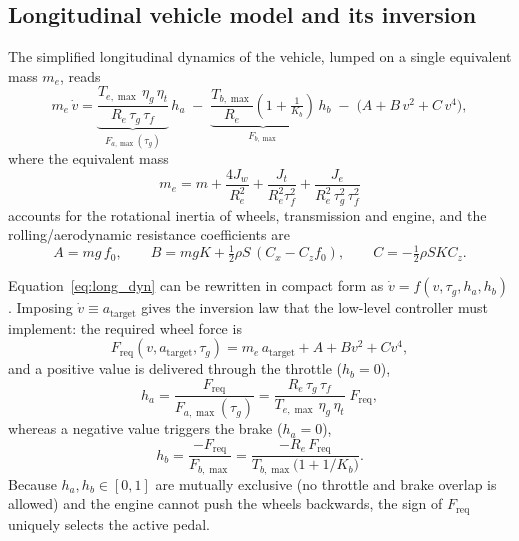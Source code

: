 \subsection{Longitudinal vehicle model and its inversion}
The simplified longitudinal dynamics of the vehicle, lumped on a single
equivalent mass $m_e$, reads
\begin{equation}
    m_e\,\dot v =
        \underbrace{\frac{T_{e,\max}\,\eta_g\,\eta_t}{R_e\,\tau_g\,\tau_f}}_{F_{a,\max}(\tau_g)}\,h_a
        \;-\;
        \underbrace{\frac{T_{b,\max}}{R_e}\!\left(1+\tfrac{1}{K_b}\right)}_{F_{b,\max}}\,h_b
        \;-\;
        \bigl(A + B\,v^{2} + C\,v^{4}\bigr),
        \label{eq:long_dyn}
\end{equation}
where the equivalent mass
\begin{equation}
    m_e = m + \frac{4 J_w}{R_e^2} + \frac{J_t}{R_e^2 \tau_f^2} +
          \frac{J_e}{R_e^2\,\tau_g^2\,\tau_f^2}
    \label{eq:meq}
\end{equation}
accounts for the rotational inertia of wheels, transmission and
engine, and the rolling/aerodynamic resistance coefficients are
\begin{equation}
    A = m g\,f_0,\qquad
    B = m g K + \tfrac{1}{2}\rho S\,(C_x - C_z f_0),\qquad
    C = -\tfrac{1}{2}\rho S K C_z.
    \label{eq:resistance_p3}
\end{equation}

Equation~\eqref{eq:long_dyn} can be rewritten in compact form as
$\dot v = f(v,\tau_g,h_a,h_b)$. Imposing $\dot v\equiv a_\text{target}$
gives the inversion law that the low-level controller must implement:
the required wheel force is
\begin{equation}
    F_\text{req}(v,a_\text{target},\tau_g)
        = m_e\,a_\text{target} + A + B v^2 + C v^4,
    \label{eq:Freq}
\end{equation}
and a positive value is delivered through the throttle ($h_b=0$),
\begin{equation}
    h_a = \frac{F_\text{req}}{F_{a,\max}(\tau_g)}
        = \frac{R_e\,\tau_g\,\tau_f}{T_{e,\max}\,\eta_g\,\eta_t}\;
          F_\text{req},
    \label{eq:ha}
\end{equation}
whereas a negative value triggers the brake ($h_a=0$),
\begin{equation}
    h_b = \frac{-F_\text{req}}{F_{b,\max}}
        = \frac{-R_e\,F_\text{req}}{T_{b,\max}\bigl(1+1/K_b\bigr)}.
    \label{eq:hb}
\end{equation}
Because $h_a,h_b\in[0,1]$ are mutually exclusive (no throttle and brake
overlap is allowed) and the engine cannot push the wheels backwards,
the sign of $F_\text{req}$ uniquely selects the active pedal.


